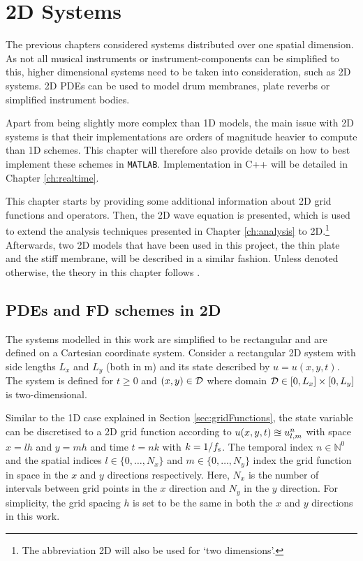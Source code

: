 \chapter{2D Systems}\label{ch:2Dsyst}
The previous chapters considered systems distributed over one spatial dimension. As not all musical instruments or instrument-components can be simplified to this, higher dimensional systems need to be taken into consideration, such as 2D systems. 2D PDEs can be used to model drum membranes, plate reverbs or simplified instrument bodies. 

Apart from being slightly more complex than 1D models, the main issue with 2D systems is that their implementations are orders of magnitude heavier to compute than 1D schemes. This chapter will therefore also provide details on how to best implement these schemes in \texttt{MATLAB}. Implementation in C++ will be detailed in Chapter \ref{ch:realtime}.

This chapter starts by providing some additional information about 2D grid functions and operators. Then, the 2D wave equation is presented, which is used to extend the analysis techniques presented in Chapter \ref{ch:analysis} to 2D.\footnote{The abbreviation 2D will also be used for `two dimensions'.} Afterwards, two 2D models that have been used in this project, the thin plate and the stiff membrane, will be described in a similar fashion. %
Unless denoted otherwise, the theory in this chapter follows \cite{theBible}.

\section{PDEs and FD schemes in 2D}\label{sec:2Dintro}
The systems modelled in this work are simplified to be rectangular and are defined on a Cartesian coordinate system. Consider a rectangular 2D system with side lengths $L_x$ and $L_y$ (both in m) and its state described by $u = u(x,y,t)$. The system is defined for $t\geq 0$ and $(x,y) \in \mathcal{D}$ where domain $\mathcal{D} \in [0, L_x]\times [0, L_y]$ is two-dimensional. 

Similar to the 1D case explained in Section \ref{sec:gridFunctions}, the state variable can be discretised to a 2D grid function according to $u(x, y, t) \approxeq u_{l,m}^n$ with space $x = lh$ and $y = mh$ and time $t = nk$ with $k=1/f_\text{s}$. The temporal index $n\in\mathbb{N}^0$  and the spatial indices $l\in \{0, \hdots, N_x\}$ and $m\in \{0, \hdots, N_y\}$ index the grid function in space in the $x$ and $y$ directions respectively. Here, $N_x$ is the number of intervals between grid points in the $x$ direction and $N_y$ in the $y$ direction. For simplicity, the grid spacing $h$ is set to be the same in both the $x$ and $y$ directions in this work.

